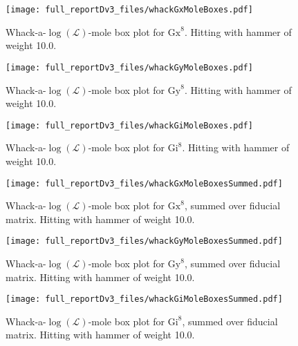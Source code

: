 {\begin{figure}
\begin{center}
\texttt{[image: full\_reportDv3\_files/whackGxMoleBoxes.pdf]}
\caption{Whack-a-$\log(\mathcal{L})$-mole box plot for $\mathrm{Gx}^{8}$.  Hitting with hammer of weight 10.0.\label{WhackGxMoleBoxPlot}}
\end{center}
\end{figure}

\begin{figure}
\begin{center}
\texttt{[image: full\_reportDv3\_files/whackGyMoleBoxes.pdf]}
\caption{Whack-a-$\log(\mathcal{L})$-mole box plot for $\mathrm{Gy}^{8}$.  Hitting with hammer of weight 10.0.\label{WhackGyMoleBoxPlot}}
\end{center}
\end{figure}

\begin{figure}
\begin{center}
\texttt{[image: full\_reportDv3\_files/whackGiMoleBoxes.pdf]}
\caption{Whack-a-$\log(\mathcal{L})$-mole box plot for $\mathrm{Gi}^{8}$.  Hitting with hammer of weight 10.0.\label{WhackGiMoleBoxPlot}}
\end{center}
\end{figure}

\begin{figure}
\begin{center}
\texttt{[image: full\_reportDv3\_files/whackGxMoleBoxesSummed.pdf]}
\caption{Whack-a-$\log(\mathcal{L})$-mole box plot for $\mathrm{Gx}^{8}$, summed over fiducial matrix.  Hitting with hammer of weight 10.0.\label{WhackGxMoleBoxPlotSummed}}
\end{center}
\end{figure}

\begin{figure}
\begin{center}
\texttt{[image: full\_reportDv3\_files/whackGyMoleBoxesSummed.pdf]}
\caption{Whack-a-$\log(\mathcal{L})$-mole box plot for $\mathrm{Gy}^{8}$, summed over fiducial matrix.  Hitting with hammer of weight 10.0.\label{WhackGyMoleBoxPlotSummed}}
\end{center}
\end{figure}

\begin{figure}
\begin{center}
\texttt{[image: full\_reportDv3\_files/whackGiMoleBoxesSummed.pdf]}
\caption{Whack-a-$\log(\mathcal{L})$-mole box plot for $\mathrm{Gi}^{8}$, summed over fiducial matrix.  Hitting with hammer of weight 10.0.\label{WhackGiMoleBoxPlotSummed}}
\end{center}
\end{figure}

}{}

